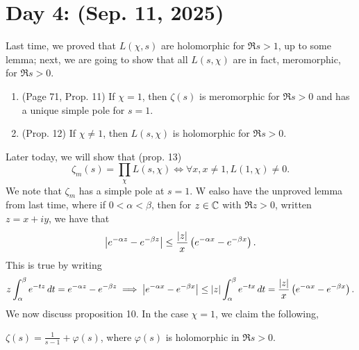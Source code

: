 \section{Day 4:  (Sep. 11, 2025)}
Last time, we proved that $L(\chi, s)$ are holomorphic for $\Re s > 1$, up to some lemma; next, we are going to show that all $L(s, \chi)$ are in fact, meromorphic, for $\Re s > 0$.
\begin{enumerate}
    \item (Page 71, Prop. 11) If $\chi = 1$, then $\zeta(s)$ is meromorphic for $\Re s > 0$ and has a unique simple pole for $s = 1$.
    \item (Prop. 12) If $\chi \neq 1$, then $L(s, \chi)$ is holomorphic for $\Re s > 0$.
\end{enumerate}
Later today, we will show that (prop. 13)
\[ \zeta_m(s) = \prod_\chi L(s, \chi) \iff \forall x, x \neq 1, L(1, \chi) \neq 0. \]
We note that $\zeta_m$ has a simple pole at $s = 1$. W ealso have the unproved lemma from last time, where if $0 < \alpha < \beta$, then for $z \in \mathbb C$ with $\Re z > 0$, written $z = x + iy$, we have that
\[ \left\lvert e^{-\alpha z} - e^{-\beta z} \right\rvert \leq \frac{\left\lvert z \right\rvert}{x} \left(e^{-\alpha x} - e^{-\beta x}\right). \]
This is true by writing
\[ z\int_\alpha^\beta e^{-tz} \, dt = e^{-\alpha z} - e^{-\beta z} \implies \left\lvert e^{-\alpha x} - e^{-\beta x} \right\rvert \leq \left\lvert z \right\rvert \int_\alpha^\beta e^{-tx} \, dt = \frac{\left\lvert z \right\rvert}{x} \left(e^{-\alpha x} - e^{-\beta x}\right). \]
\hrulebar
\noindent We now discuss proposition 10. In the case $\chi = 1$, we claim the following,
\begin{claim}[Prop. 10]
    $\zeta(s) = \frac{1}{s-1} + \varphi(s)$, where $\varphi(s)$ is holomorphic in $\Re s > 0$.
\end{claim}
